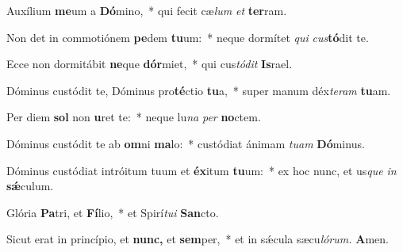 \item Auxílium \textbf{me}um a \textbf{Dó}mino,~* qui fecit cæ\textit{lum} \textit{et} \textbf{ter}ram.
\item Non det in commotiónem \textbf{pe}dem \textbf{tu}um:~* neque dormítet \textit{qui} \textit{cus}\textbf{tó}dit te.
\item Ecce non dormitábit \textbf{ne}que \textbf{dór}miet,~* qui cus\textit{tódit} \textbf{Is}rael.
\item Dóminus custódit te, Dóminus pro\textbf{té}ctio \textbf{tu}a,~* super manum déx\textit{teram} \textbf{tu}am.
\item Per diem \textbf{sol} non \textbf{u}ret te:~* neque lu\textit{na} \textit{per} \textbf{no}ctem.
\item Dóminus custódit te ab \textbf{om}ni \textbf{ma}lo:~* custódiat ánimam \textit{tuam} \textbf{Dó}minus.
\item Dóminus custódiat intróitum tuum et \textbf{éx}itum \textbf{tu}um:~* ex hoc nunc, et us\textit{que} \textit{in} \textbf{sǽ}culum.
\item Glória \textbf{Pa}tri, et \textbf{Fí}lio,~* et Spirí\tinyhspace\textit{tui} \textbf{San}cto.
\item Sicut erat in princípio, et \textbf{nunc,} et \textbf{sem}per,~* et in sǽcula sæcu\tinyhspace\textit{lórum.} \textbf{A}men.
